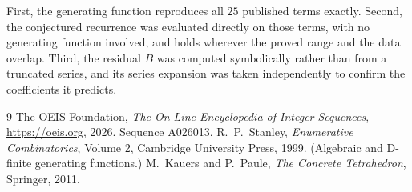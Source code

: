 \documentclass[11pt,a4paper]{article}
\theoremstyle{plain}
\theoremstyle{definition}
\begin{document}
First, the generating function reproduces all $25$ published terms exactly. Second,
the conjectured recurrence was evaluated directly on those terms, with no generating function
involved, and holds wherever the proved range and the data overlap. Third, the residual $B$ was
computed symbolically rather than from a truncated series, and its series expansion was taken
independently to confirm the coefficients it predicts.

\begin{thebibliography}{9}
 The OEIS Foundation, \emph{The On-Line Encyclopedia of Integer Sequences},
\url{https://oeis.org}, 2026. Sequence A026013.
 R.~P.~Stanley, \emph{Enumerative Combinatorics}, Volume 2, Cambridge
University Press, 1999. (Algebraic and D-finite generating functions.)
 M.~Kauers and P.~Paule, \emph{The Concrete Tetrahedron}, Springer, 2011.
\end{thebibliography}
\end{document}
